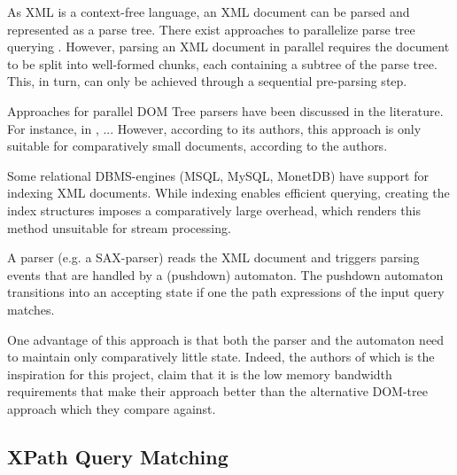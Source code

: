  As XML is a context-free language, an XML
document can be parsed and represented as a parse tree. There exist approaches
to parallelize parse tree querying . However, parsing
an XML document in parallel requires the document to be split into well-formed
chunks, each containing a subtree of the parse tree. This, in turn, can only be
achieved through a sequential pre-parsing step.

Approaches for parallel DOM Tree parsers have been discussed in the literature.
For instance, in , ... However, according to its authors, this
approach is only suitable for comparatively small documents, according to the
authors.


Some relational DBMS-engines (MSQL, MySQL, MonetDB) have support for indexing
XML documents. While indexing enables efficient querying, creating the index
structures imposes a comparatively large overhead, which renders this method
unsuitable for stream processing.


A parser (e.g. a SAX-parser) reads the XML document and triggers parsing events
that are handled by a (pushdown) automaton. The pushdown automaton transitions
into an accepting state if one the path expressions of the input query matches.

One advantage of this approach is that both the parser and the automaton need to
maintain only comparatively little state. Indeed, the authors of 
which is the inspiration for this project, claim that it is the low memory
bandwidth requirements that make their approach better than the alternative
DOM-tree approach which they compare against.

\subsection{XPath Query Matching}







